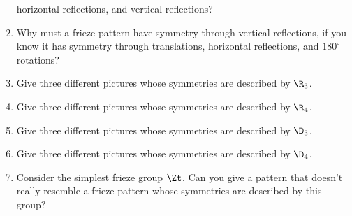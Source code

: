 \begin{enumerate}
  horizontal reflections, and vertical reflections?
\item Why must a frieze pattern have symmetry through vertical
  reflections, if you know it has symmetry through translations,
  horizontal reflections, and $180^\circ$ rotations?
\item Give three different pictures whose symmetries are described by
  $\R_3$.
\item Give three different pictures whose symmetries are described by
  $\R_4$.
\item Give three different pictures whose symmetries are described by
  $\D_3$.
\item Give three different pictures whose symmetries are described by
  $\D_4$.
\item Consider the simplest frieze group $\Zt$. Can you give a
  pattern that doesn't really resemble a frieze pattern whose
  symmetries are described by this group?
\end{enumerate}
